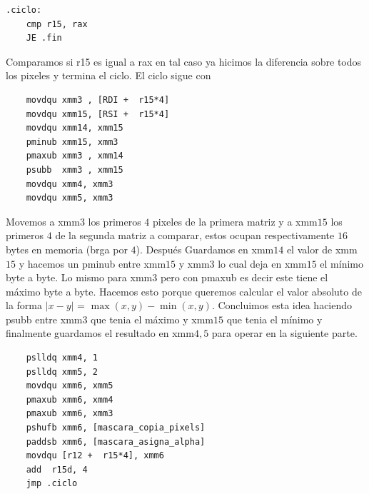 \documentclass[a4paper]{article}
\begin{document}
\begin{codesnippet}
\begin{verbatim}
.ciclo:
    cmp r15, rax
    JE .fin
\end{verbatim}
\end{codesnippet}

 Comparamos si r15 es igual a rax en tal caso ya hicimos la diferencia sobre todos los pixeles y termina el ciclo. El ciclo sigue con

\begin{codesnippet}
\begin{verbatim}
    movdqu xmm3 , [RDI +  r15*4]   
    movdqu xmm15, [RSI +  r15*4]
    movdqu xmm14, xmm15     
    pminub xmm15, xmm3        
    pmaxub xmm3 , xmm14        
    psubb  xmm3 , xmm15             
    movdqu xmm4, xmm3 
    movdqu xmm5, xmm3       
\end{verbatim}
\end{codesnippet}

 Movemos a xmm$3$ los primeros $4$ pixeles de la primera matriz y a xmm$15$ los primeros $4$ de la segunda matriz a comparar, estos ocupan respectivamente $16$ bytes en memoria (brga por $4$). Después Guardamos en xmm$14$ el valor de xmm$15$ y hacemos un pminub entre xmm$15$ y xmm$3$ lo cual deja en xmm$15$ el mínimo byte a byte. Lo mismo para xmm$3$ pero con pmaxub es decir este tiene el máximo byte a byte. Hacemos esto porque queremos calcular el valor absoluto de la forma $|x-y|$ = $\max(x,y) - \min(x,y)$. Concluimos esta idea haciendo psubb entre xmm$3$ que tenia el máximo y xmm$15$ que tenia el mínimo y finalmente guardamos el resultado en xmm$4,5$ para operar en la siguiente parte.

\begin{codesnippet}
\begin{verbatim}
    pslldq xmm4, 1                  
    pslldq xmm5, 2               
    movdqu xmm6, xmm5             
    pmaxub xmm6, xmm4             
    pmaxub xmm6, xmm3              
    pshufb xmm6, [mascara_copia_pixels] 
    paddsb xmm6, [mascara_asigna_alpha]
    movdqu [r12 +  r15*4], xmm6
    add  r15d, 4
    jmp .ciclo
\end{verbatim}
\end{codesnippet}
\end{document}
